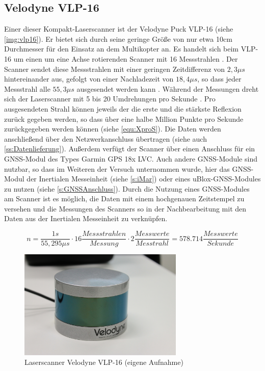 \documentclass[a4paper,12pt,bibliography=totoc, listof=totoc,titlepage,pointlessnumbers]{scrreprt}
\begin{document}
\subsection{Velodyne VLP-16}
\label{sss:vlp16}
Einer dieser Kompakt-Laserscanner ist der Velodyne Puck VLP-16 (siehe \autoref{img:vlp16}). Er bietet sich durch seine geringe Größe von nur etwa 10cm Durchmesser für den Einsatz an dem Multikopter an. Es handelt sich beim VLP-16 um einen um eine Achse rotierenden Scanner mit 16 Messstrahlen \citep{vlpSheet}. Der Scanner sendet diese Messstrahlen mit einer geringen Zeitdifferenz von \(2,3\mu s\) hintereinander aus, gefolgt von einer Nachladezeit von \(18,4\mu s\), so dass jeder Messstrahl alle \(55,3\mu s\) ausgesendet werden kann \citep[S. 16]{vlpManual}. Während der Messungen dreht sich der Laserscanner mit 5 bis 20 Umdrehungen pro Sekunde \citep{vlpSheet}. Pro ausgesendeten Strahl können jeweils der die erste und die stärkste Reflexion zurück gegeben werden, so dass über eine halbe Million Punkte pro Sekunde zurückgegeben werden können (siehe \autoref{equ:XproS}). Die Daten werden anschließend über den Netzwerkanschluss übertragen (siehe auch \autoref{ss:Datenlieferung}). Außerdem verfügt der Scanner über einen Anschluss für ein GNSS-Modul des Types Garmin GPS 18x LVC. Auch andere GNSS-Module sind nutzbar, so dass im Weiteren der Versuch unternommen wurde, hier das GNSS-Modul der Inertialen Messeinheit (siehe \autoref{s:iMar}) oder eines uBlox-GNSS-Modules zu nutzen (siehe \autoref{s:GNSSAnschluss}). Durch die Nutzung eines GNSS-Modules am Scanner ist es möglich, die Daten mit einem hochgenauen Zeitstempel zu versehen und die Messungen des Scanners so in der Nachbearbeitung mit den Daten aus der Inertialen Messeinheit zu verknüpfen.

\begin{equation}
 \label{equ:XproS}
 n = \frac{1s}{55,295\mu s} \cdot 16  \frac{Messstrahlen}{Messung} \cdot 2  \frac{Messwerte}{Messtrahl} = 578.714 \frac{Messwerte}{Sekunde}
\end{equation}

\begin{figure}[ht!]
 \centering
 \includegraphics[width=0.7\textwidth]{./img/vlp16.jpg}
 \caption{Laserscanner Velodyne VLP-16 (eigene Aufnahme)}
 \label{img:vlp16}
\end{figure}
\end{document}

